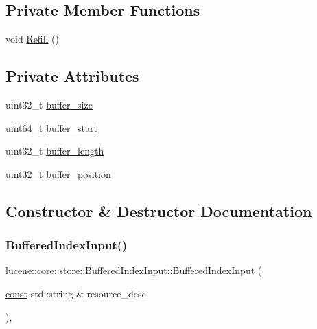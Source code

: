 \subsection*{Private Member Functions}
\begin{DoxyCompactItemize}
\item 
void \mbox{\hyperlink{classlucene_1_1core_1_1store_1_1BufferedIndexInput_a455156408cce76203d45b9f2d94be2c5}{Refill}} ()
\end{DoxyCompactItemize}
\subsection*{Private Attributes}
\begin{DoxyCompactItemize}
\item 
uint32\+\_\+t \mbox{\hyperlink{classlucene_1_1core_1_1store_1_1BufferedIndexInput_a93fdee4afc7f7efba930969747112f8a}{buffer\+\_\+size}}
\item 
uint64\+\_\+t \mbox{\hyperlink{classlucene_1_1core_1_1store_1_1BufferedIndexInput_a96d673cee23a8b3d8981497d2092b246}{buffer\+\_\+start}}
\item 
uint32\+\_\+t \mbox{\hyperlink{classlucene_1_1core_1_1store_1_1BufferedIndexInput_a27c78a82da88cc2dd8fc041f23f73c5f}{buffer\+\_\+length}}
\item 
uint32\+\_\+t \mbox{\hyperlink{classlucene_1_1core_1_1store_1_1BufferedIndexInput_ac8a5aac5cc22828fa8c5534ef24cf299}{buffer\+\_\+position}}
\end{DoxyCompactItemize}


\subsection{Constructor \& Destructor Documentation}
\mbox{\label{classlucene_1_1core_1_1store_1_1BufferedIndexInput_a017ac4b59db1a4b76692a730a46a6530}} 
\subsubsection{\texorpdfstring{Buffered\+Index\+Input()}{BufferedIndexInput()}\hspace{0.1cm}{\footnotesize\ttfamily [1/3]}}
{\footnotesize\ttfamily lucene\+::core\+::store\+::\+Buffered\+Index\+Input\+::\+Buffered\+Index\+Input (\begin{DoxyParamCaption}\item[{\mbox{\hyperlink{ZlibCrc32_8h_a2c212835823e3c54a8ab6d95c652660e}{const}} std\+::string \&}]{resource\+\_\+desc }\end{DoxyParamCaption})\hspace{0.3cm}{\ttfamily [inline]}, {\ttfamily [explicit]}}

